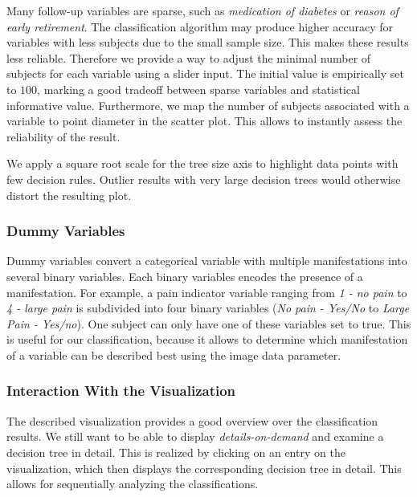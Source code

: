 \documentclass[a4paper,twoside]{style/article}
\newcommand{\com}[1]{\textcolor{orange}{\uline{#1}}}
\begin{document}
Many follow-up variables are sparse, such as \emph{medication of diabetes} or \emph{reason of early retirement}.
The classification algorithm may produce higher accuracy for variables with less subjects due to the small sample size.
This makes these results less reliable.
Therefore we provide a way to adjust the minimal number of subjects for each variable using a slider input.
The initial value is empirically set to $100$, marking a good tradeoff between sparse variables and statistical informative value.
Furthermore, we map the number of subjects associated with a variable to point diameter in the scatter plot.
This allows to instantly assess the reliability of the result.

We apply a square root scale for the tree size axis to highlight data points with few decision rules.
Outlier results with very large decision trees would otherwise distort the resulting plot.

%
\subsubsection{Dummy Variables}
Dummy variables convert a categorical variable with multiple manifestations into several binary variables.
Each binary variables encodes the presence of a manifestation.
For example, a pain indicator variable ranging from \emph{1 - no pain} to \emph{4 - large pain} is subdivided into four binary variables (\emph{No pain - Yes/No} to \emph{Large Pain - Yes/no}).
One subject can only have one of these variables set to true.
This is useful for our classification, because it allows to determine which manifestation of a variable can be described best using the image data parameter.
\subsubsection{Interaction With the Visualization}
The described visualization provides a good overview over the classification results.
We still want to be able to display \emph{details-on-demand} \cite{shneiderman1996} and examine a decision tree in detail.
This is realized by clicking on an entry on the visualization, which then displays the corresponding decision tree in detail.
This allows for sequentially analyzing the classifications.
\end{document}
